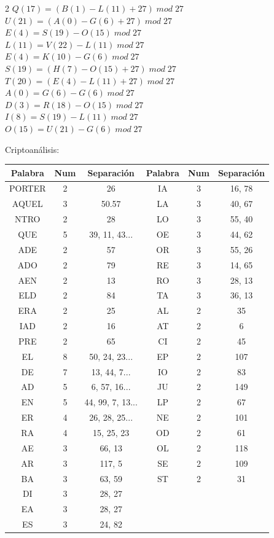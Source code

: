 \documentclass{article}
\begin{document}
\begin{enumerate}
\begin{multicols}{2}
$Q (17) = (B (1) - L (11) + 27) \;  mod \; 27$\\
$U (21) = (A (0) - G (6) + 27) \;  mod \; 27 $\\
$E (4) = S (19) - O (15)\;  mod \; 27$\\
$L (11) = V (22) - L (11)  \;  mod \; 27$\\
$E (4) = K (10) - G (6) \;  mod \; 27 $\\
$S (19) = (H (7) - O (15) + 27)\;  mod \; 27$\\
$T (20) = (E (4) - L (11) + 27)  \;  mod \; 27$\\
$A (0) = G (6) - G (6) \;  mod \; 27 $\\
$D (3) = R (18) - O (15) \;  mod \; 27$\\
$I (8) = S (19) - L (11)  \;  mod \; 27$\\
$O (15) = U (21) - G (6) \;  mod \; 27 $\\
\end{multicols}

Criptoanálisis:


\begin{tabular}{|c|c|c|c|c|c|}
\hline 
Palabra & Num & Separación & Palabra & Num & Separación\\ \hline 
PORTER & 2 & 26 & IA & 3 & 16, 78 \\ \hline
AQUEL & 3 & 50.57 & LA & 3 & 40, 67 \\ \hline
NTRO & 2 & 28 & LO & 3 & 55, 40 \\ \hline
QUE & 5 & 39, 11, 43... & OE & 3 & 44, 62 \\ \hline
ADE & 2 & 57 & OR & 3 & 55, 26 \\ \hline
ADO & 2 & 79 & RE & 3 & 14, 65 \\ \hline
AEN & 2 & 13 & RO & 3 & 28, 13 \\ \hline
ELD & 2 & 84 & TA & 3 & 36, 13 \\ \hline
ERA & 2 & 25 & AL & 2 & 35 \\ \hline
IAD &2 & 16 & AT & 2 & 6 \\ \hline
PRE & 2 & 65 & CI & 2 & 45 \\ \hline
EL & 8 & 50, 24, 23... & EP & 2 & 107\\ \hline
DE & 7 & 13, 44, 7... & IO & 2 & 83\\ \hline
AD & 5 &  6, 57, 16... & JU & 2 & 149\\ \hline
EN & 5 &  44, 99, 7, 13... & LP & 2 & 67\\ \hline
ER &  4 &  26, 28, 25... & NE & 2 & 101\\ \hline
RA & 4 & 15, 25, 23 & OD & 2 & 61 \\ \hline
AE & 3 & 66, 13 & OL & 2 & 118\\ \hline
AR & 3 & 117, 5 & SE & 2 & 109\\ \hline
BA & 3 & 63, 59 & ST & 2 & 31\\ \hline
DI & 3 & 28, 27 & & &  \\ \hline
EA & 3 & 28, 27 & & & \\ \hline
ES & 3 & 24, 82 & & & \\ \hline


\end{tabular}
\end{enumerate}
\end{document}
